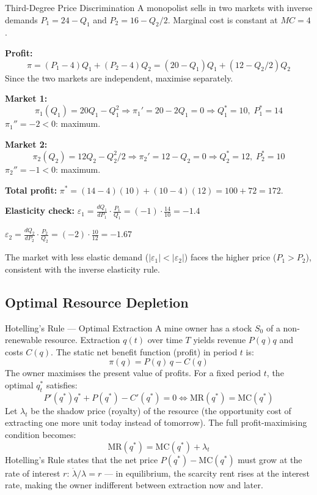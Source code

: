 \documentclass[12pt, a4paper]{article}
\theoremstyle{definition}
\begin{document}
\begin{exbox}{Third-Degree Price Discrimination}
A monopolist sells in two markets with inverse demands $P_1 = 24-Q_1$ and
$P_2 = 16 - Q_2/2$.  Marginal cost is constant at $MC = 4$.

\textbf{Profit:}
\[
  \pi = (P_1-4)Q_1 + (P_2-4)Q_2
      = (20-Q_1)Q_1 + (12-Q_2/2)Q_2
\]
Since the two markets are independent, maximise separately.

\textbf{Market 1:}
\[
  \pi_1(Q_1) = 20Q_1 - Q_1^2
  \Rightarrow \pi_1' = 20-2Q_1 = 0
  \Rightarrow Q_1^* = 10, \; P_1^* = 14
\]
$\pi_1'' = -2 < 0$: maximum. \checkmark

\textbf{Market 2:}
\[
  \pi_2(Q_2) = 12Q_2 - Q_2^2/2
  \Rightarrow \pi_2' = 12-Q_2 = 0
  \Rightarrow Q_2^* = 12, \; P_2^* = 10
\]
$\pi_2'' = -1 < 0$: maximum. \checkmark

\textbf{Total profit:}
$\pi^* = (14-4)(10)+(10-4)(12) = 100+72 = 172$.

\textbf{Elasticity check:}
$\varepsilon_1 = \frac{dQ_1}{dP_1}\cdot\frac{P_1}{Q_1} = (-1)\cdot\frac{14}{10} = -1.4$

$\varepsilon_2 = \frac{dQ_2}{dP_2}\cdot\frac{P_2}{Q_2} = (-2)\cdot\frac{10}{12} = -1.67$

The market with less elastic demand ($|\varepsilon_1|<|\varepsilon_2|$) faces the higher price ($P_1>P_2$), consistent with the inverse elasticity rule.
\end{exbox}

\subsection{Optimal Resource Depletion}

\begin{exbox}{Hotelling's Rule --- Optimal Extraction}
A mine owner has a stock $S_0$ of a non-renewable resource.
Extraction $q(t)$ over time $T$ yields revenue $P(q)q$ and costs $C(q)$.
The static net benefit function (profit) in period $t$ is:
\[
  \pi(q) = P(q)\,q - C(q)
\]
The owner maximises the present value of profits.  For a fixed period $t$,
the optimal $q_t^*$ satisfies:
\[
  P'(q^*)q^* + P(q^*) - C'(q^*) = 0
  \iff \text{MR}(q^*) = \text{MC}(q^*)
\]
Let $\lambda_t$ be the shadow price (royalty) of the resource (the
opportunity cost of extracting one more unit today instead of tomorrow).
The full profit-maximising condition becomes:
\[
  \text{MR}(q^*) = \text{MC}(q^*) + \lambda_t
\]
Hotelling's Rule states that the net price $P(q^*)-\text{MC}(q^*)$ must
grow at the rate of interest $r$:
$\dot\lambda/\lambda = r$ --- in equilibrium, the scarcity rent rises at the
interest rate, making the owner indifferent between extraction now and later.
\end{exbox}
\newpage
\end{document}
